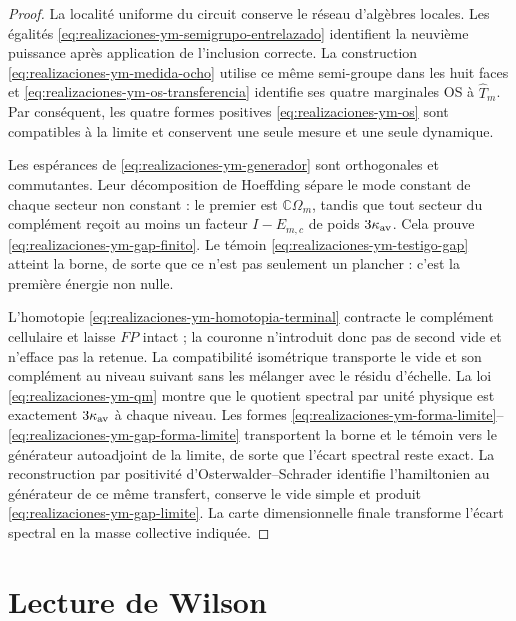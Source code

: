\begin{proof}
La localité uniforme du circuit conserve le réseau d’algèbres locales. Les
égalités \eqref{eq:realizaciones-ym-semigrupo-entrelazado} identifient la
neuvième puissance après application de l’inclusion correcte. La construction
\eqref{eq:realizaciones-ym-medida-ocho} utilise ce même semi-groupe dans les huit
faces et \eqref{eq:realizaciones-ym-os-transferencia} identifie ses quatre
marginales OS à \(\widehat T_m\). Par conséquent, les quatre formes positives
\eqref{eq:realizaciones-ym-os} sont compatibles à la limite et conservent une
seule mesure et une seule dynamique.

Les espérances de \eqref{eq:realizaciones-ym-generador} sont orthogonales et
commutantes. Leur décomposition de Hoeffding sépare le mode constant de chaque
secteur non constant : le premier est \(\mathbb C\Omega_m\), tandis que tout
secteur du complément reçoit au moins un facteur \(I-E_{m,c}\) de poids
\(3\kappa_{\rm av}\). Cela prouve
\eqref{eq:realizaciones-ym-gap-finito}. Le témoin
\eqref{eq:realizaciones-ym-testigo-gap} atteint la borne, de sorte que ce n’est pas
seulement un plancher : c’est la première énergie non nulle.

L'homotopie \eqref{eq:realizaciones-ym-homotopia-terminal} contracte le complément cellulaire et laisse \(FP\) intact ; la couronne n'introduit donc pas de second vide et n'efface pas la retenue. La compatibilité isométrique transporte le vide et son complément au niveau suivant sans les mélanger avec le résidu d'échelle. La loi \eqref{eq:realizaciones-ym-qm} montre que le quotient spectral par unité physique est exactement \(3\kappa_{\rm av}\) à chaque niveau. Les formes \eqref{eq:realizaciones-ym-forma-limite}--\eqref{eq:realizaciones-ym-gap-forma-limite} transportent la borne et le témoin vers le générateur autoadjoint de la limite, de sorte que l'écart spectral reste exact. La reconstruction par positivité d'Osterwalder--Schrader identifie l'hamiltonien au générateur de ce même transfert, conserve le vide simple et produit \eqref{eq:realizaciones-ym-gap-limite}. La carte dimensionnelle finale transforme l'écart spectral en la masse collective indiquée.
\end{proof}



\section*{Lecture de Wilson}

